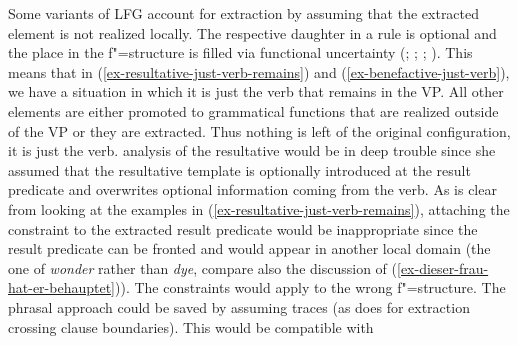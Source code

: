 Some variants of LFG account for extraction by assuming that the extracted element is not realized locally. The respective daughter
in a rule is optional and the place in the f"=structure is filled via functional uncertainty
(\citealp{KZ89a}; \citealt[]{Dalrymple2001a-u}; \citealp*{DKK2001a-u}; \citealt{ZK2002a}). This means that in
(\ref{ex-resultative-just-verb-remains}) and (\ref{ex-benefactive-just-verb}), we have a situation
in which it is just the verb that remains in the VP. All other elements are either promoted to
grammatical functions that are realized outside of the VP or they 
are extracted. Thus nothing is left of the original configuration, it is just the
verb.  analysis of the resultative would be in deep trouble since she assumed that the
resultative template is optionally introduced at the result predicate and overwrites optional information coming
from the verb. As is clear from looking at the examples in (\ref{ex-resultative-just-verb-remains}),
attaching the constraint to the extracted result predicate would be inappropriate since the result
predicate can be fronted and would appear in another local domain (the one of \emph{wonder} rather
than \emph{dye}, compare also the discussion of (\ref{ex-dieser-frau-hat-er-behauptet})). The constraints would apply to
the wrong f"=structure. The phrasal approach could be saved by assuming traces (as
\citet[Chapter~6]{Berman2003a} does for extraction crossing clause boundaries). This would be compatible with

